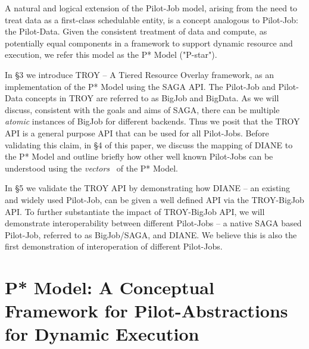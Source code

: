 \documentclass[conference,final]{IEEEtran}
\newcommand{\jhanote}[1]{ {\textcolor{red} { ***shantenu: #1 }}}
\newcommand{\jhanote}[1]{}
\begin{document}
A natural and logical extension of the Pilot-Job model, arising from
the need to treat data as a first-class schedulable entity, is a
concept analogous to Pilot-Job: the Pilot-Data. Given the consistent
treatment of data and compute, as potentially equal components in a
framework to support dynamic resource and execution, we refer this
model as the P* Model ("P-star").

In \S3 we introduce TROY -- A Tiered Resource Overlay framework, as an
implementation of the P* Model using the SAGA API. The Pilot-Job and
Pilot-Data concepts in TROY are referred to as BigJob and BigData. As
we will discuss, consistent with the goals and aims of SAGA, there can
be multiple {\it atomic} instances of BigJob for different backends.
Thus we posit that the TROY API is a general purpose API that can be
used for all Pilot-Jobs. Before validating this claim, in \S4 of this
paper, we discuss the mapping of DIANE to the P* Model and outline
briefly how other well known Pilot-Jobs can be understood using the
{\it vectors}~\cite{dpa_surveypaper} of the P* Model.

In \S5 we validate the TROY API by demonstrating how DIANE -- an
existing and widely used Pilot-Job, can be given a well defined API
via the TROY-BigJob API. To further substantiate the impact of
TROY-BigJob API, we will demonstrate interoperability between
different Pilot-Jobs -- a native SAGA based Pilot-Job, referred to as
BigJob/SAGA, and DIANE.  We believe this is also the first
demonstration of interoperation of different Pilot-Jobs.





\section{P* Model: A Conceptual Framework for Pilot-Abstractions for
  Dynamic Execution}
\label{sec:pilot-model}
\end{document}
